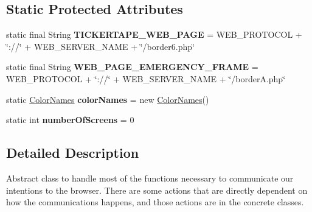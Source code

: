 \subsection*{Static Protected Attributes}
\begin{DoxyCompactItemize}
\item 
\hypertarget{classgov_1_1fnal_1_1ppd_1_1dd_1_1display_1_1client_1_1ConnectionToBrowserInstance_a07f932b29a0bdeb7c0811fd0f815afbb}{static final String {\bfseries T\-I\-C\-K\-E\-R\-T\-A\-P\-E\-\_\-\-W\-E\-B\-\_\-\-P\-A\-G\-E} = W\-E\-B\-\_\-\-P\-R\-O\-T\-O\-C\-O\-L + \char`\"{}\-://\char`\"{} + W\-E\-B\-\_\-\-S\-E\-R\-V\-E\-R\-\_\-\-N\-A\-M\-E + \char`\"{}/border6.\-php\char`\"{}}\label{classgov_1_1fnal_1_1ppd_1_1dd_1_1display_1_1client_1_1ConnectionToBrowserInstance_a07f932b29a0bdeb7c0811fd0f815afbb}

\item 
\hypertarget{classgov_1_1fnal_1_1ppd_1_1dd_1_1display_1_1client_1_1ConnectionToBrowserInstance_a1081b866c3ae5aa9f6fe831ea3484d2c}{static final String {\bfseries W\-E\-B\-\_\-\-P\-A\-G\-E\-\_\-\-E\-M\-E\-R\-G\-E\-N\-C\-Y\-\_\-\-F\-R\-A\-M\-E} = W\-E\-B\-\_\-\-P\-R\-O\-T\-O\-C\-O\-L + \char`\"{}\-://\char`\"{} + W\-E\-B\-\_\-\-S\-E\-R\-V\-E\-R\-\_\-\-N\-A\-M\-E + \char`\"{}/border\-A.\-php\char`\"{}}\label{classgov_1_1fnal_1_1ppd_1_1dd_1_1display_1_1client_1_1ConnectionToBrowserInstance_a1081b866c3ae5aa9f6fe831ea3484d2c}

\item 
\hypertarget{classgov_1_1fnal_1_1ppd_1_1dd_1_1display_1_1client_1_1ConnectionToBrowserInstance_a519ae3dcdae79f106e41b5d7887c992b}{static \hyperlink{classgov_1_1fnal_1_1ppd_1_1dd_1_1util_1_1ColorNames}{Color\-Names} {\bfseries color\-Names} = new \hyperlink{classgov_1_1fnal_1_1ppd_1_1dd_1_1util_1_1ColorNames}{Color\-Names}()}\label{classgov_1_1fnal_1_1ppd_1_1dd_1_1display_1_1client_1_1ConnectionToBrowserInstance_a519ae3dcdae79f106e41b5d7887c992b}

\item 
\hypertarget{classgov_1_1fnal_1_1ppd_1_1dd_1_1display_1_1client_1_1ConnectionToBrowserInstance_a7366adfc07c9163c5f6efcbc0c3985b7}{static int {\bfseries number\-Of\-Screens} = 0}\label{classgov_1_1fnal_1_1ppd_1_1dd_1_1display_1_1client_1_1ConnectionToBrowserInstance_a7366adfc07c9163c5f6efcbc0c3985b7}

\end{DoxyCompactItemize}


\subsection{Detailed Description}
Abstract class to handle most of the functions necessary to communicate our intentions to the browser. There are some actions that are directly dependent on how the communications happens, and those actions are in the concrete classes. 

